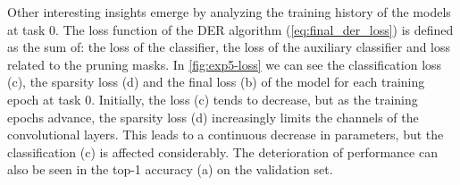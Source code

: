 Other interesting insights emerge by analyzing the training history of the models at task 0. The loss function of the DER algorithm (\autoref{eq:final_der_loss}) is defined as the sum of: the loss of the classifier, the loss of the auxiliary classifier and loss related to the pruning masks. In \autoref{fig:exp5-loss} we can see the classification loss (c), the sparsity loss (d) and the final loss (b) of the model for each training epoch at task 0. Initially, the loss (c) tends to decrease, but as the training epochs advance, the sparsity loss (d) increasingly limits the channels of the convolutional layers. This leads to a continuous decrease in parameters, but the classification (c) is affected considerably. The deterioration of performance can also be seen in the top-1 accuracy (a) on the validation set.


\begin{figure}[H]
	\centering
    
    
    

\end{figure}
